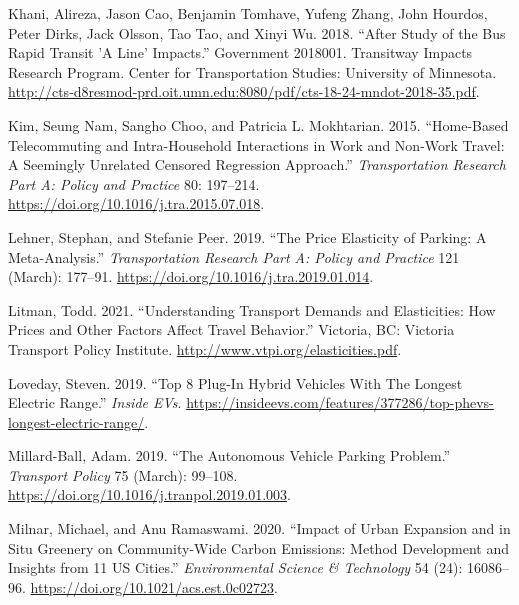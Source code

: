 \documentclass[
]{book}
\newlength{\cslhangindent}
\newlength{\cslentryspacingunit} %
\newenvironment{CSLReferences}[2] %
 {%
  \setlength{\parindent}{0pt}
  \ifodd #1
  \let\oldpar\par
  \def\par{\hangindent=\cslhangindent\oldpar}
  \fi
  \setlength{\parskip}{#2\cslentryspacingunit}
 }%
 {}
\begin{document}
\begin{CSLReferences}{1}{0}
\leavevmode{}%
Khani, Alireza, Jason Cao, Benjamin Tomhave, Yufeng Zhang, John Hourdos, Peter Dirks, Jack Olsson, Tao Tao, and Xinyi Wu. 2018. {``After {Study} of the {Bus Rapid Transit} '{A Line}' {Impacts}.''} Government 2018001. Transitway {Impacts Research Program}. {Center for Transportation Studies}: {University of Minnesota}. \url{http://cts-d8resmod-prd.oit.umn.edu:8080/pdf/cts-18-24-mndot-2018-35.pdf}.

\leavevmode{}%
Kim, Seung Nam, Sangho Choo, and Patricia L. Mokhtarian. 2015. {``Home-Based Telecommuting and Intra-Household Interactions in Work and Non-Work Travel: {A} Seemingly Unrelated Censored Regression Approach.''} \emph{Transportation Research Part A: Policy and Practice} 80: 197--214. \url{https://doi.org/10.1016/j.tra.2015.07.018}.

\leavevmode{}%
Lehner, Stephan, and Stefanie Peer. 2019. {``The Price Elasticity of Parking: {A} Meta-Analysis.''} \emph{Transportation Research Part A: Policy and Practice} 121 (March): 177--91. \url{https://doi.org/10.1016/j.tra.2019.01.014}.

\leavevmode{}%
Litman, Todd. 2021. {``Understanding {Transport Demands} and {Elasticities}: {How Prices} and {Other Factors Affect Travel Behavior}.''} {Victoria, BC}: {Victoria Transport Policy Institute}. \url{http://www.vtpi.org/elasticities.pdf}.

\leavevmode{}%
Loveday, Steven. 2019. {``Top 8 {Plug-In Hybrid Vehicles With The Longest Electric Range}.''} \emph{Inside EVs}. \url{https://insideevs.com/features/377286/top-phevs-longest-electric-range/}.

\leavevmode{}%
Millard-Ball, Adam. 2019. {``The Autonomous Vehicle Parking Problem.''} \emph{Transport Policy} 75 (March): 99--108. \url{https://doi.org/10.1016/j.tranpol.2019.01.003}.

\leavevmode{}%
Milnar, Michael, and Anu Ramaswami. 2020. {``Impact of Urban Expansion and in Situ Greenery on Community-Wide Carbon Emissions: {Method} Development and Insights from 11 {US} Cities.''} \emph{Environmental Science \& Technology} 54 (24): 16086--96. \url{https://doi.org/10.1021/acs.est.0c02723}.


\end{CSLReferences}
\end{document}
